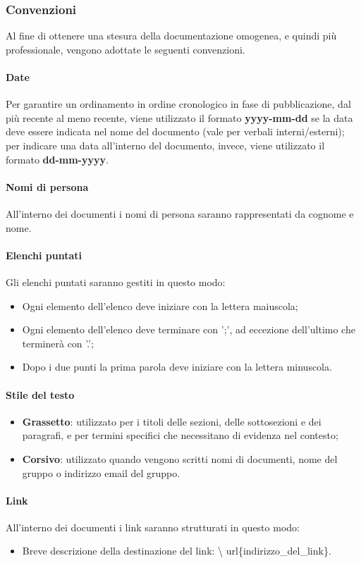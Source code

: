 \subsubsection{Convenzioni}
Al fine di ottenere una stesura della documentazione omogenea, e quindi più
professionale, vengono adottate le seguenti convenzioni.
\paragraph{Date}
Per garantire un ordinamento in ordine cronologico in fase di pubblicazione,
dal più recente al meno recente, viene utilizzato il formato
\textbf{yyyy-mm-dd} se la data deve essere indicata nel nome del documento
(vale per verbali interni/esterni); per indicare una data all'interno del
documento, invece, viene utilizzato il formato \textbf{dd-mm-yyyy}.
\paragraph{Nomi di persona}
All'interno dei documenti i nomi di persona saranno rappresentati da cognome e
nome.
\paragraph{Elenchi puntati}
Gli elenchi puntati saranno gestiti in questo modo:
\begin{itemize}
      \item Ogni elemento dell'elenco deve iniziare con la lettera maiuscola;
      \item Ogni elemento dell'elenco deve terminare con ';', ad eccezione dell'ultimo che
            terminerà con '.';
      \item Dopo i due punti la prima parola deve iniziare con la lettera minuscola.
\end{itemize}
\paragraph{Stile del testo}
\begin{itemize}
      \item \textbf{Grassetto}: utilizzato per i titoli delle sezioni, delle sottosezioni e dei paragrafi,
            e per termini specifici che necessitano di evidenza nel contesto;
      \item \textbf{Corsivo}: utilizzato quando vengono scritti nomi di documenti,
            nome del gruppo o indirizzo email del gruppo.
\end{itemize}
\paragraph{Link}
All'interno dei documenti i link saranno strutturati in questo modo:
\begin{itemize}
      \item Breve descrizione della destinazione del link: \textbackslash
            url\{indirizzo\_del\_link\}.
\end{itemize}
